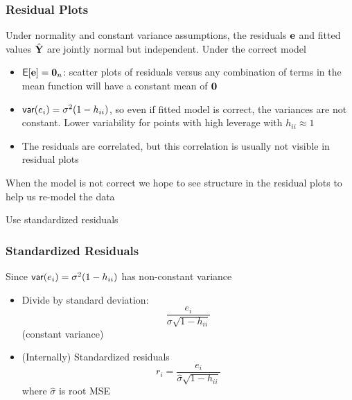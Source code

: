 \documentclass[]{beamer}
\begin{document}
\begin{frame}
  \frametitle{Residual Plots}
  Under normality and constant variance assumptions,  the residuals
  $\mathbf{e}$ and fitted values $\hat{\mathbf{Y}}$ are jointly normal but independent.
 \pause
Under the correct model
 \pause
  \begin{itemize}
    \item  $\textsf{E}[\mathbf{e}] = \mathbf{0}_n$:  scatter plots of residuals versus any
      combination of  terms in the mean function will have a constant
      mean of $\mathbf{0}$  \pause
    \item $\textsf{var}(e_i) = \sigma^2(1 - h_{ii})$, so even if fitted model
      is correct, the variances are not constant.  Lower variability
      for points with high leverage with $h_{ii} \approx 1$ \pause
  \item The residuals are correlated, but this correlation is usually
    not visible in residual plots  \pause 
    
  \end{itemize}
When the model is not correct we hope to see structure in the residual
plots to help us re-model the data  \pause

Use standardized residuals


\end{frame}
\begin{frame}
  \frametitle{Standardized Residuals}
Since $\textsf{var}(e_i) = \sigma^2( 1 - h_{ii})$ has non-constant variance
 \pause
\begin{itemize}
\item 
Divide by standard deviation:  $$\frac{e_i}{\sigma \sqrt{1 -
    h_{ii}}}$$ (constant variance)  \pause

\item (Internally) Standardized residuals $$r_i =  \frac{e_i}{\hat{\sigma} \sqrt{1 -
    h_{ii}}}$$
where $\hat{\sigma}$ is root MSE  \pause
\end{itemize}

\end{frame}
\end{document}
